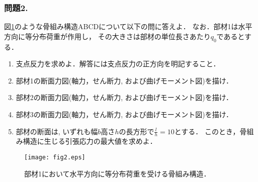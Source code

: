 \documentclass[10pt,a4j]{jarticle}
\begin{document}
\subsubsection*{問題2.}
図\ref{fig:fig2}のような骨組み構造ABCDについて以下の問に答えよ．
なお．部材1は水平方向に等分布荷重が作用し，
その大きさは部材の単位長さあたり$q_0$であるとする．
\begin{enumerate}
\item
	支点反力を求めよ．解答には支点反力の正方向を明記すること．
\item	
	部材1の断面力図(軸力，せん断力, および曲げモーメント図)を描け．
\item	
	部材2の断面力図(軸力，せん断力, および曲げモーメント図)を描け．
\item	
	部材3の断面力図(軸力，せん断力, および曲げモーメント図)を描け．
\item	
	部材の断面は, いずれも幅$b$高さ$h$の長方形で$\frac{l}{h}=10$とする．
	このとき，骨組み構造に生じる引張応力の最大値を求めよ．
\end{enumerate}
\begin{figure}[h]
	\begin{center}
	\texttt{[image: fig2.eps]} 
	\end{center}
	\caption{
		部材1において水平方向に等分布荷重を受ける骨組み構造．
	} 
	\label{fig:fig2}
\end{figure}
\end{document}

